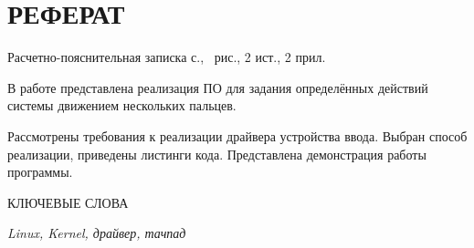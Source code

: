 \section*{РЕФЕРАТ}

Расчетно-пояснительная записка \pageref{LastPage} с., \totalfigures\ рис., 2 ист., 2 прил.

В работе представлена реализация ПО для задания определённых действий системы движением нескольких пальцев.

Рассмотрены требования к реализации драйвера устройства ввода. Выбран способ реализации, приведены листинги кода. Представлена демонстрация работы программы.

КЛЮЧЕВЫЕ СЛОВА

\textit{Linux, Kernel, драйвер, тачпад}

\clearpage